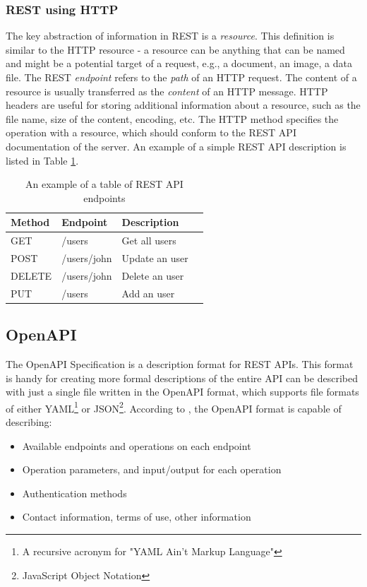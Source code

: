 \subsubsection{REST using HTTP}
The key abstraction of information in REST is a \textit{resource}. This definition is similar to the HTTP resource -  a resource can be anything that can be named and might be a potential target of a request, e.g., a document, an image, a data file. The REST \textit{endpoint} refers to the \textit{path} of an HTTP request. The content of a resource is usually transferred as the \textit{content} of an HTTP message. HTTP headers are useful for storing additional information about a resource, such as the file name, size of the content, encoding, etc. The HTTP method specifies the operation with a resource, which should conform to the REST API documentation of the server. An example of a simple REST API description is listed in Table \ref{restapiex}.
\begin{table}[hbt]
\centering
\label{restapiex}
\begin{tabular}{|l|l|l|l|}
\hline
\textbf{Method} & \textbf{Endpoint} & \textbf{Description} \\ \hline
 GET & /users & Get all users \\ \hline
 POST & /users/john & Update an user  \\ \hline
 DELETE & /users/john &  Delete an user \\ \hline
 PUT & /users & Add an user \\ \hline
\end{tabular}
\caption{An example of a table of REST API endpoints }
\end{table} 

\subsection{OpenAPI}
The OpenAPI Specification is a description format for REST APIs. This format is handy for creating more formal descriptions of the entire API can be described with just a single file written in the OpenAPI format, which supports file formats of either YAML\footnote{A recursive acronym for "YAML Ain't Markup Language"} or JSON\footnote{JavaScript Object Notation}. According to \cite{SwaggerDocs}, the OpenAPI format is capable of describing:

\begin{itemize}
    \item Available endpoints and operations on each endpoint
    \item Operation parameters, and input/output for each operation
    \item Authentication methods
    \item Contact information, terms of use, other information
\end{itemize}

